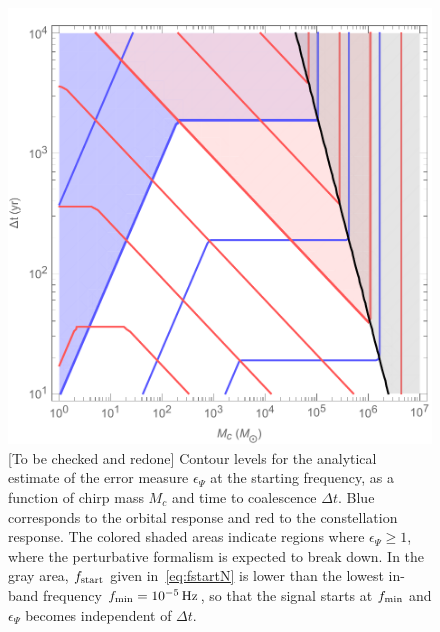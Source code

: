 \documentclass[aps,showpacs,twocolumn,
prd,superscriptaddress,nofootinbib]{revtex4-1}
\newcommand{\Hz}{\,\mathrm{Hz}}
\newcommand{\Mchirp}{M_{c}}
\newcommand{\SM}[1]{{\color{Red} #1}}
\begin{document}
\begin{figure}
  \centering
  \includegraphics[width=.9\linewidth]{plots/lisafom_Psi_McDeltat.pdf}
  \caption{\SM{[To be checked and redone]} Contour levels for the analytical estimate of the error measure $\epsilon_{\Psi}$ at the starting frequency, as a function of chirp mass $\Mchirp$ and time to coalescence $\Delta t$. Blue corresponds to the orbital response and red to the constellation response. The colored shaded areas indicate regions where $\epsilon_{\Psi} \geq 1$, where the perturbative formalism is expected to break down. In the gray area, $f_{\rm start}$ given in~\eqref{eq:fstartN} is lower than the lowest in-band frequency $f_{\rm min} = 10^{-5}\Hz$, so that the signal starts at $f_{\rm min}$ and $\epsilon_{\Psi}$ becomes independent of $\Delta t$.}
  \label{fig:lisafomPsiMcDeltat}
\end{figure}
\end{document}
